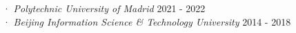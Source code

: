 
 · \textit{Polytechnic University of Madrid}	\hfill 2021 - 2022\\

 · \textit{Beijing Information Science \& Technology University} \hfill 2014 - 2018\\